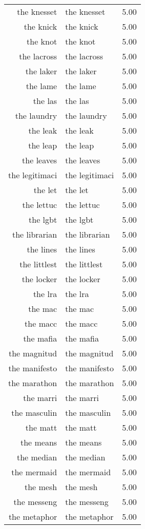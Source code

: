 \begin{table}[ht]
\begin{tabular}{rlr}
  the knesset & the knesset & 5.00 \\ 
  the knick & the knick & 5.00 \\ 
  the knot & the knot & 5.00 \\ 
  the lacross & the lacross & 5.00 \\ 
  the laker & the laker & 5.00 \\ 
  the lame & the lame & 5.00 \\ 
  the las & the las & 5.00 \\ 
  the laundry & the laundry & 5.00 \\ 
  the leak & the leak & 5.00 \\ 
  the leap & the leap & 5.00 \\ 
  the leaves & the leaves & 5.00 \\ 
  the legitimaci & the legitimaci & 5.00 \\ 
  the let & the let & 5.00 \\ 
  the lettuc & the lettuc & 5.00 \\ 
  the lgbt & the lgbt & 5.00 \\ 
  the librarian & the librarian & 5.00 \\ 
  the lines & the lines & 5.00 \\ 
  the littlest & the littlest & 5.00 \\ 
  the locker & the locker & 5.00 \\ 
  the lra & the lra & 5.00 \\ 
  the mac & the mac & 5.00 \\ 
  the macc & the macc & 5.00 \\ 
  the mafia & the mafia & 5.00 \\ 
  the magnitud & the magnitud & 5.00 \\ 
  the manifesto & the manifesto & 5.00 \\ 
  the marathon & the marathon & 5.00 \\ 
  the marri & the marri & 5.00 \\ 
  the masculin & the masculin & 5.00 \\ 
  the matt & the matt & 5.00 \\ 
  the means & the means & 5.00 \\ 
  the median & the median & 5.00 \\ 
  the mermaid & the mermaid & 5.00 \\ 
  the mesh & the mesh & 5.00 \\ 
  the messeng & the messeng & 5.00 \\ 
  the metaphor & the metaphor & 5.00 \\ 

\end{tabular}
\end{table}

